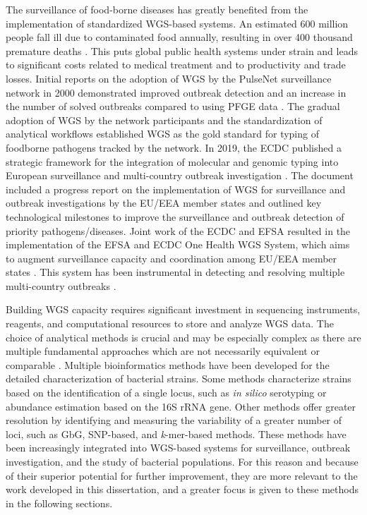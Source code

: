 The surveillance of food-borne diseases has greatly benefited from the implementation of standardized \ac{WGS}-based systems. An estimated 600 million people fall ill due to contaminated food annually, resulting in over 400 thousand premature deaths \cite{who_global_2022}. This puts global public health systems under strain and leads to significant costs related to medical treatment and to productivity and trade losses. Initial reports on the adoption of \ac{WGS} by the PulseNet surveillance network in 2000 demonstrated improved outbreak detection and an increase in the number of solved outbreaks compared to using \ac{PFGE} data \cite{besser_next-generation_2018, jackson_implementation_2016, ribot_pulsenet_2019}. The gradual adoption of \ac{WGS} by the network participants and the standardization of analytical workflows established \ac{WGS} as the gold standard for typing of foodborne pathogens tracked by the network. In 2019, the \ac{ECDC} published a strategic framework for the integration of molecular and genomic typing into European surveillance and multi-country outbreak investigation \cite{european_centre_for_disease_prevention_and_control_ecdc_2019}. The document included a progress report on the implementation of \ac{WGS} for surveillance and outbreak investigations by the \ac{EU/EEA} member states and outlined key technological milestones to improve the surveillance and outbreak detection of priority pathogens/diseases. Joint work of the \ac{ECDC} and \ac{EFSA} resulted in the implementation of the \ac{EFSA} and \ac{ECDC} One Health \ac{WGS} System, which aims to augment surveillance capacity and coordination among \ac{EU/EEA} member states \cite{authority_efsa_guidelines_2022}. This system has been instrumental in detecting and resolving multiple multi-country outbreaks \cite{efsa_prolonged_2024, authority_prolonged_2024, european_centre_for_disease_prevention_and_control_european_food_safety_authority_multi-country_2023, european_centre_for_disease_prevention_and_control_european_food_safety_authority_multi-country_2022}.

Building \ac{WGS} capacity requires significant investment in sequencing instruments, reagents, and computational resources to store and analyze \ac{WGS} data. The choice of analytical methods is crucial and may be especially complex as there are multiple fundamental approaches which are not necessarily equivalent or comparable \cite{mixao_multi-country_2025}. Multiple bioinformatics methods have been developed for the detailed characterization of bacterial strains. Some methods characterize strains based on the identification of a single locus, such as \textit{in silico} serotyping or abundance estimation based on the 16S \ac{rRNA} gene. Other methods offer greater resolution by identifying and measuring the variability of a greater number of loci, such as \ac{GbG}, \ac{SNP}-based, and \textit{k}-mer-based methods. These methods have been increasingly integrated into \ac{WGS}-based systems for surveillance, outbreak investigation, and the study of bacterial populations. For this reason and because of their superior potential for further improvement, they are more relevant to the work developed in this dissertation, and a greater focus is given to these methods in the following sections.

